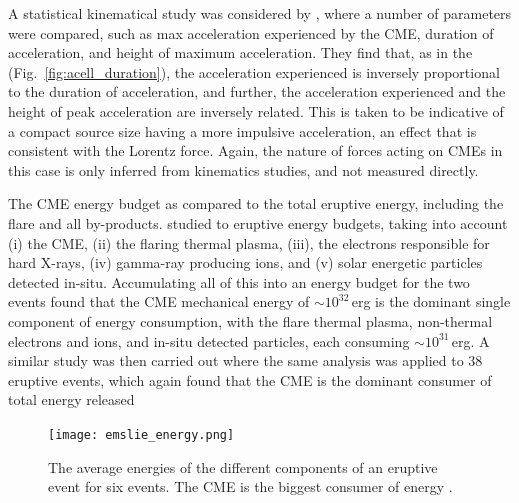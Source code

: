 A statistical kinematical study was considered by \citep{bein2011}, where a number of parameters were compared, such as max acceleration experienced by the CME, duration of acceleration, and height of maximum acceleration. They find that, as in the \citet{zhang2006} (Fig.~\ref{fig:acell_duration}), the acceleration experienced is inversely proportional to the duration of acceleration, and further, the acceleration experienced and the height of peak acceleration are inversely related. This is taken to be indicative of a compact source size having a more impulsive acceleration, an effect that is consistent with the Lorentz force. Again, the nature of forces acting on CMEs in this case is only inferred from kinematics studies, and not measured directly.

The CME energy budget as compared to the total eruptive energy, including the flare and all by-products. \citet{emslie2004} studied to eruptive energy budgets, taking into account (i) the CME, (ii) the flaring thermal plasma, (iii), the electrons responsible for hard X-rays, (iv) gamma-ray producing ions, and (v) solar energetic particles detected in-situ. Accumulating all of this into an energy budget for the two events found that the CME mechanical energy of $\sim10^{32}$\,erg is the dominant single component of energy consumption, with the flare thermal plasma, non-thermal electrons and ions, and in-situ detected particles, each consuming $\sim10^{31}$\,erg. A similar study was then carried out where the same analysis was applied to 38 eruptive events, which again found that the CME is the dominant consumer of total energy released \citep{emslie2012}
\begin{figure}
\begin{center}
\texttt{[image: emslie\_energy.png]}
\caption{The average energies of the different components of an eruptive event for six events. The CME is the biggest consumer of energy \citep{emslie2012}.}
\label{fig:emslie_energy}
\end{center}
\end{figure}



